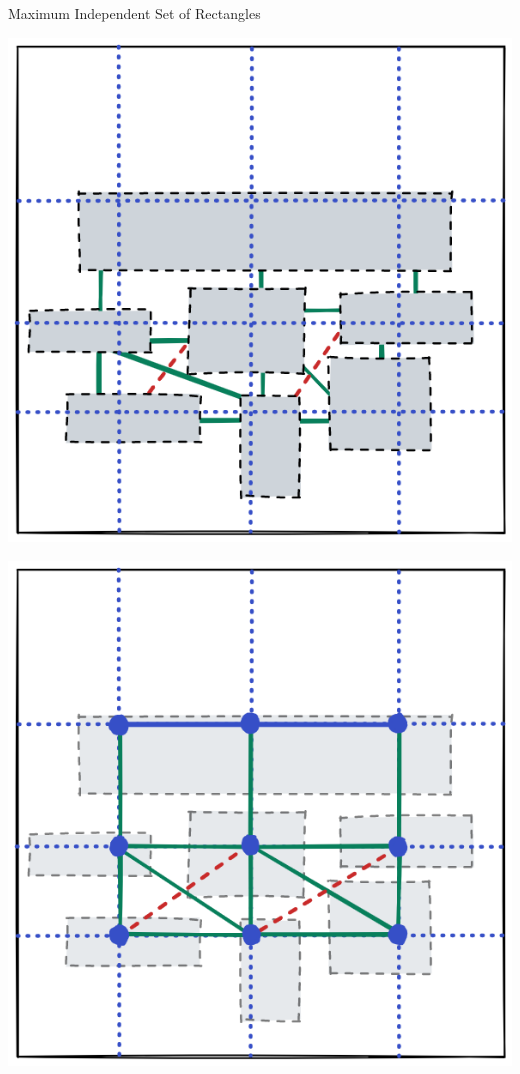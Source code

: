 \documentclass[handout,usenames,dvipsnames]{beamer}
\begin{document}
\begin{frame}{Maximum Independent Set of Rectangles}
    \begin{minipage}{0.45\textwidth}
    \includegraphics[width=\textwidth]{g12.png}
    \end{minipage}\hfill
    \begin{minipage}{0.45\textwidth}
    \includegraphics[width=\textwidth]{g13.png}
    \end{minipage}
\end{frame}
\end{document}
